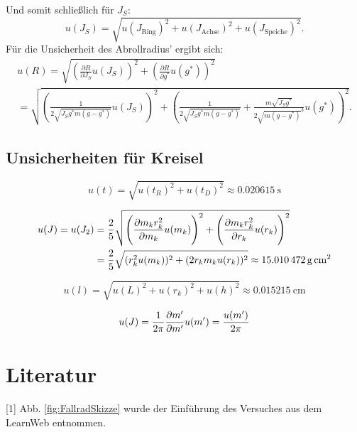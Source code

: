 \documentclass[11pt,a4paper,titlepage, ngerman]{article}
\begin{document}
	Und somit schließlich für $J_S$:
	\begin{equation*}
		u(J_S)= \sqrt{u(J_\text{Ring})^2 + u(J_\text{Achse})^2 + u(J_\text{Speiche})^2}.
	\end{equation*}
	Für die Unsicherheit des Abrollradius' ergibt sich:
	\begin{align*}
		u(R) = \sqrt{\left( \frac{\partial R}{\partial J_S}u(J_S)\right)^2 + \left(\frac{\partial R}{\partial g^{*}}u(g^{*})\right) ^2} \\
		= \sqrt{\left( \frac{1}{2\sqrt{J_S g^{*} m(g-g^{*})}}u(J_S)\right)^2 + \left(\frac{1}{2\sqrt{J_S g^{*} m(g-g^{*})}}+\frac{m\sqrt{J_S g^{*}}}{2\sqrt{m(g-g^{*})}^3} u(g^{*})\right) ^2}.
	\end{align*}
	
	\subsection{Unsicherheiten für Kreisel}
	
	
	\begin{equation}
	\label{eq:unc_t}
	u(t) = \sqrt{u(t_R)^2 + u(t_D)^2} \approx \SI{0,020615}{\second}
	\end{equation}
	
	\begin{align}
	\label{eq:unc_traeg}
	u(J) = u(J_2) &= \frac{2}{5} \sqrt{\left( \pdv{m_k r_k^2}{m_k} u(m_k)\right) ^2 + \left( \pdv{m_k r_k^2}{r_k} u(r_k)\right) ^2}\\
	&= \frac{2}{5} \sqrt{(r_k^2 u(m_k))^2 + (2r_k m_k u(r_k))^2} \approx \SI{15,010472}{g\,\centi\meter\squared}
	\end{align}
	
	\begin{equation}
	\label{eq:unc_length}
	u(l) = \sqrt{u(L)^2 + u(r_k)^2 + u(h)^2} \approx \SI{0,015215}{\centi\meter}
	\end{equation}
	
	\begin{equation}
	\label{eq:unc_traeg2}
	u(J) = \frac{1}{2\pi} \pdv{m'}{m'} u(m') = \frac{u(m')}{2\pi}
	\end{equation}
	
\section*{Literatur}
	
	[1] Abb. \ref{fig:FallradSkizze} wurde der Einführung des Versuches aus dem LearnWeb entnommen.
	
\end{document}
